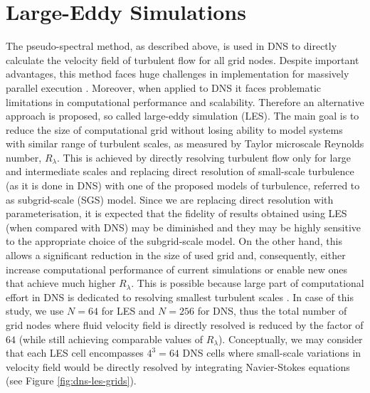\documentclass{pracamgren}
\begin{document}
\section{Large-Eddy Simulations}
\label{sc:ch1.les}

The pseudo-spectral method, as described above, is used in DNS to directly calculate the velocity field of turbulent flow for all grid nodes.
Despite important advantages, this method faces huge challenges in implementation for massively parallel execution \parencite{Onishi2013}. 
Moreover, when applied to DNS it faces problematic limitations in computational performance and scalability. 
Therefore an alternative approach is proposed, so called large-eddy simulation (LES). 
The main goal is to reduce the size of computational grid without losing ability to model systems with similar range of turbulent scales, as measured by Taylor microscale Reynolds number, $R_{\lambda}$.
This is achieved by directly resolving turbulent flow only for large and intermediate scales and replacing direct resolution of small-scale turbulence (as it is done in DNS) with one of the proposed models of turbulence, referred to as subgrid-scale (SGS) model.
Since we are replacing direct resolution with parameterisation, it is expected that the fidelity of results obtained using LES (when compared with DNS) may be diminished and they may be highly sensitive to the appropriate choice of the subgrid-scale model.
On the other hand, this allows a significant reduction in the size of used grid and, consequently, either increase computational performance of current simulations or enable new ones that achieve much higher $R_{\lambda}$.
This is possible because large part of computational effort in DNS is dedicated to resolving smallest turbulent scales \parencite[p. 558]{Pope2000}.
In case of this study, we use $N=64$ for LES and $N=256$ for DNS, thus the total number of grid nodes where fluid velocity field is directly resolved is reduced by the factor of $64$ (while still achieving comparable values of $R_{\lambda}$).
Conceptually, we may consider that each LES cell encompasses $4^3=64$ DNS cells where small-scale variations in velocity field would be directly resolved by integrating Navier-Stokes equations (see Figure \ref{fig:dns-les-grids}).
\end{document}
